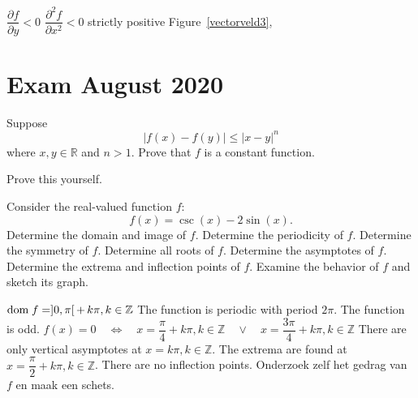 \begin{Answer}
\begin{multicols}{2}

\Question $\dfrac{\partial f}{\partial y}<0$
\Question $\dfrac{\partial^2 f}{\partial x^2}<0$
\Question strictly positive
\Question Figure~\ref{vectorveld3},
 \EndCurrentQuestion
\end{multicols}
\end{Answer}




\section{Exam August 2020}

\begin{Exercise} %
Suppose
$$|f(x)-f(y)|\leq|x-y|^n$$ 
where $x,y\in\mathbb{R}$ and $n>1$. Prove that $f$ is a constant function.
\end{Exercise} 

\begin{Answer}\phantom{}
Prove this yourself.
\end{Answer}


\begin{Exercise} %
Consider the real-valued function $f$:
$$
f(x)=\csc(x)-2\sin(x).
$$
\Question Determine the domain and image of $f$.
\Question Determine the periodicity of $f$.
\Question Determine the symmetry of $f$.
\Question Determine all roots of $f$.
\Question Determine the asymptotes of $f$.
\Question Determine the extrema and inflection points of $f$.
\Question Examine the behavior of $f$ and sketch its graph.
\EndCurrentQuestion
\end{Exercise}

\begin{Answer}

\Question  $\text{dom}{\;f} = ]0, \pi [ \,  + \,  k \pi, k \in \mathbb{Z}$
\Question The function is periodic with period $2 \pi$.
\Question The function is odd.
\Question $f(x) = 0 \quad \Leftrightarrow \quad x = \dfrac{\pi}{4} + k \pi, k \in \mathbb{Z} \quad \vee \quad x = \dfrac{3\pi}{4} + k \pi, k \in \mathbb{Z}$
\Question There are only vertical asymptotes at $x=k \pi, k \in \mathbb{Z}$.
\Question The extrema are found at $x = \dfrac{\pi}{2} + k \pi, k \in \mathbb{Z} $. There are no inflection points. 
\Question Onderzoek zelf het gedrag van $f$ en maak een schets. 

\end{Answer}


